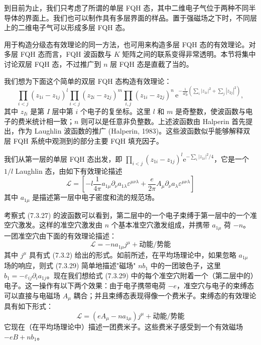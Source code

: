 到目前为止，我们只考虑了所谓的单层 FQH 态，其中二维电子气位于两种不同半导体的界面上。我们也可以制作具有多层界面的样品。置于强磁场之下时，不同层上的二维电子气可以形成多层 FQH 态。

用于构造分级态有效理论的同一方法，也可用来构造多层 FQH 态的有效理论。对多层 FQH 态而言，FQH 波函数与 $K$ 矩阵之间的联系变得非常透明。本节将集中讨论双层 FQH 态，不过推广到 $n$ 层 FQH 态是直截了当的。

我们想为下面这个简单的双层 FQH 态构造有效理论：
\begin{equation*}
\prod_{i<j}(z_{1i}-z_{1j})^{l}\prod_{i<j}(z_{2i}-z_{2j})^{m}\prod_{i,j}(z_{1i}-z_{2j})^{n}\,
\mathrm{e}^{-\frac{1}{4l_{B}^{2}}\left(\sum_{i}|z_{1i}|^{2}+\sum_{j}|z_{2j}|^{2}\right)}, \tag{7.3.27}
\end{equation*}
其中 $z_{Ii}$ 是第 $I$ 层中第 $i$ 个电子的复坐标。这里 $l$ 和 $m$ 是奇整数，使波函数与电子的费米统计相一致；$n$ 则可以是任意非负整数。上述波函数由 Halperin 首先提出，作为 Laughlin 波函数的推广 (Halperin, 1983)。这些波函数似乎能够解释双层 FQH 系统中观测到的部分主要 FQH 填充因子。

我们从第一层的单层 FQH 态出发，即 $\prod_{i<j}(z_{1i}-z_{1j})^{l}\mathrm{e}^{-\sum_{i}|z_{1i}|^{2}/4}$，它是一个 $1/l$ Laughlin 态，由如下有效理论描述
\begin{equation*}
\mathcal{L}=\left[-l\frac{1}{4\pi}a_{1\mu}\partial_{\nu}a_{1\lambda}\varepsilon^{\mu\nu\lambda}
+\frac{e}{2\pi}A_{\mu}\partial_{\nu}a_{\lambda}\varepsilon^{\mu\nu\lambda}\right] \tag{7.3.28}
\end{equation*}
其中 $a_{1\mu}$ 是描述第一层中电子密度和流的规范场。

考察式 (7.3.27) 的波函数可以看到，第二层中的一个电子束缚于第一层中的一个准空穴激发。这样的准空穴激发由 $n$ 个基本准空穴激发组成，并携带 $a_{1\mu}$ 荷 $-n$。一团准空穴由下面的有效理论描述：
\begin{equation*}
\mathcal{L}=-na_{1\mu}j^{\mu}+\text{动能/势能} \tag{7.3.29}
\end{equation*}
其中 $j^{\mu}$ 具有式 (7.3.2) 给出的形式。如前所述，在平均场理论中，如果忽略 $a_{1\mu}$ 场的响应，则式 (7.3.29) 简单地描述"磁场" $nb_{1}$ 中的一团玻色子，这里 $b_{1}=-\varepsilon_{ij}\partial_{i}a_{1j}$。现在我们想给式 (7.3.29) 中的每个准空穴附着一个（第二层中的）电子。这一操作有以下两个效果：由于电子携带电荷 $-e$，准空穴与电子的束缚态可以直接与电磁场 $A_{\mu}$ 耦合；并且束缚态表现得像一个费米子。束缚态的有效理论具有如下形式：
\begin{equation*}
\mathcal{L}=(eA_{\mu}-na_{1\mu})j^{\mu}+\text{动能/势能} \tag{7.3.30}
\end{equation*}
它现在（在平均场理论中）描述一团费米子。这些费米子感受到一个有效磁场 $-eB+nb_{1}$。

